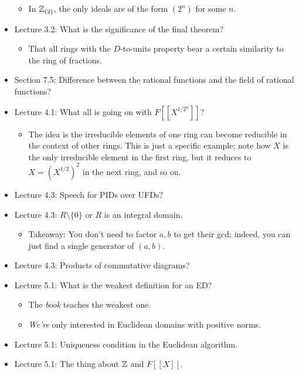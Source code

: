 \documentclass[../notes.tex]{subfiles}
\begin{document}
\begin{itemize}
    \begin{itemize}
        \item In $\mathbb{Z}_{(2)}$, the only ideals are of the form $(2^n)$ for some $n$.
    \end{itemize}
    \item Lecture 3.2: What is the significance of the final theorem?
    \begin{itemize}
        \item That all rings with the $D$-to-units property bear a certain similarity to the ring of fractions.
    \end{itemize}
    \item Section 7.5: Difference between the rational functions and the field of rational functions?
    \item Lecture 4.1: What all is going on with $F[[X^{1/2^n}]]$?
    \begin{itemize}
        \item The idea is the irreducible elements of one ring can become reducible in the context of other rings. This is just a specific example; note how $X$ is the only irreducible element in the first ring, but it reduces to $X=(X^{1/2})^2$ in the next ring, and so on.
    \end{itemize}
    \item Lecture 4.3: Speech for PIDs over UFDs?
    \item Lecture 4.3: $R\setminus\{0\}$ or $R$ is an integral domain.
    \begin{itemize}
        \item Takeaway: You don't need to factor $a,b$ to get their gcd; indeed, you can just find a single generator of $(a,b)$.
    \end{itemize}
    \item Lecture 4.3: Products of commutative diagrams?
    \item Lecture 5.1: What is the weakest definition for an ED?
    \begin{itemize}
        \item The \emph{book} teaches the weakest one.
        \item \emph{We're} only interested in Euclidean domains with positive norms.
    \end{itemize}
    \item Lecture 5.1: Uniqueness condition in the Euclidean algorithm.
    \item Lecture 5.1: The thing about $\mathbb{Z}$ and $F[[X]]$.
    \begin{itemize}

\end{itemize}
\end{itemize}
\end{document}

